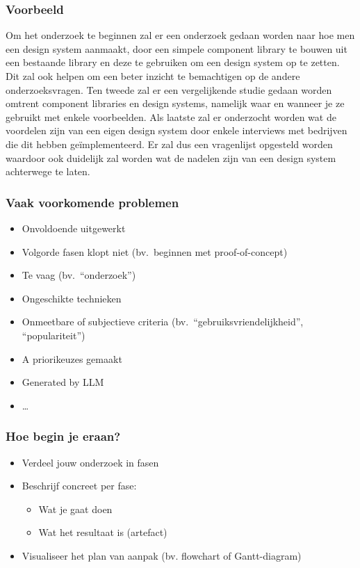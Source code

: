 \documentclass[aspectratio=169]{beamer}
\begin{document}
\begin{frame}
  \frametitle{Voorbeeld}

  \small

  Om het onderzoek te beginnen zal er een onderzoek gedaan worden naar hoe men een design system aanmaakt, door een simpele component library te bouwen uit een bestaande library en deze te gebruiken om een design system op te zetten. Dit zal ook helpen om een beter inzicht te bemachtigen op de andere onderzoeksvragen. Ten tweede zal er een vergelijkende studie gedaan worden omtrent component libraries en design systems, namelijk waar en wanneer je ze gebruikt met enkele voorbeelden. Als laatste zal er onderzocht worden wat de voordelen zijn van een eigen design system door enkele interviews met bedrijven die dit hebben geïmplementeerd. Er zal dus een vragenlijst opgesteld worden waardoor ook duidelijk zal worden wat de nadelen zijn van een design system achterwege te laten.

\end{frame}

\begin{frame}
  \frametitle{Vaak voorkomende problemen}

  \begin{itemize}
    \item Onvoldoende uitgewerkt
    \item Volgorde fasen klopt niet (bv.\ beginnen met proof-of-concept)
    \item Te vaag (bv.\ ``onderzoek'')
    \item Ongeschikte technieken
    \item Onmeetbare of subjectieve criteria (bv.\ ``gebruiksvriendelijkheid'', ``populariteit'')
    \item A priorikeuzes gemaakt
    \item Generated by LLM
    \item \ldots
  \end{itemize}

\end{frame}

\begin{frame}
  \frametitle{Hoe begin je eraan?}

  \begin{itemize}
    \item Verdeel jouw onderzoek in fasen
    \item Beschrijf concreet per fase:
          \begin{itemize}
            \item Wat je gaat doen
            \item Wat het resultaat is (artefact)
          \end{itemize}
    \item Visualiseer het plan van aanpak (bv. flowchart of Gantt-diagram)
  \end{itemize}
\end{frame}
\end{document}
